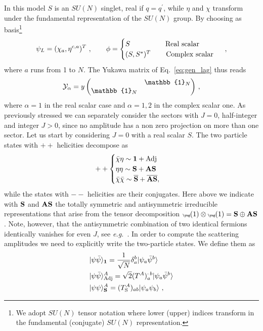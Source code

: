 \documentclass[a4paper,11pt]{article}
\newcommand{\be}{\begin{equation}}
\newcommand{\ee}{\end{equation}}
\newcommand{\nn}{\nonumber}
\begin{document}
In this model $S$ is an $SU(N)$ singlet, real if $q=q^\prime$, while $\eta$ and $\chi$ transform under the fundamental representation of the $SU(N)$ group.
By choosing as basis\footnote{We adopt $SU(N)$ tensor notation  where lower (upper) indices transform in the fundamental (conjugate) $SU(N)$ representation.  }
\be
\psi_L = (\chi_{a},\eta^{c,a})^T\ , \qquad
\phi=
\begin{cases}
S \qquad\qquad\quad  {\rm Real~scalar}\\
(S,S^*)^T \qquad  {\rm \, Complex~scalar}\\
\end{cases} \ ,
\ee
where $a$ runs from 1 to $N$. The Yukawa matrix of Eq.~\eqref{eq:gen_lag} thus reads
\be
{\cal Y}_\alpha= y
\begin{pmatrix}
& \mathbb{1}_N \\
\mathbb{1}_N& 
\end{pmatrix} \,,
\ee
where $\alpha=1$ in the real scalar case and $\alpha=1,2$ in the complex scalar one. As previously stressed we can separately consider the sectors with $J=0$,  half-integer and integer $J>0$, since no amplitude has a non zero projection on more than one sector. Let us start by considering  $J=0$ with a real scalar $S$.  The two particle states with $++$ helicities decompose as
\be\label{eq:model1_J0_dec}
++
\begin{cases}
 \bar\chi \eta  \sim {\bf 1}+ {\rm Adj}  \\
 \eta \eta \sim {\rm{\bf S}}+{\rm{\bf AS}} \\
 \bar\chi\bar \chi \sim  {\rm{\bf{\overline{S}}}}+{\rm{\bf \overline{AS}}} , 
\end{cases} 
\ee
while the states with $--$ helicities are their conjugates. Here above we indicate with ${\rm{\bf S}}$ and ${\rm{\bf AS}}$ the totally symmetric and antisymmetric irreducible representations that arise from the tensor decomposition ${\tiny{\yng(1)}}\otimes {\tiny{\yng(1)}} = {\rm{\bf S}} \oplus {\rm{\bf AS}}$. Note, however, that the antisymmetric combination of two identical fermions identically vanishes for even $J$, see {\emph{e.g.}}~\cite{Jacob:1959at}. In order to compute the scattering amplitudes we need to explicitly write the two-particle states. We define them as 
\begin{align}\label{eq:states}
& |\psi \bar \psi \rangle_{\bf 1} =  \frac{1}{\sqrt N}\delta_a^b|\psi_a \bar \psi^b\rangle \nn \\
& |\psi \bar \psi \rangle^A_{{\rm Adj}} = \sqrt{2}(T^A)_a^{\cdot\,b} |\psi_a \bar \psi^b\rangle \nn \\
& |\psi \psi\rangle^A_{{\rm{\bf S}}} = (T^A_{\rm S})_{ab} |\psi_a \psi _b\rangle  \ , 
\end{align}
\end{document}
